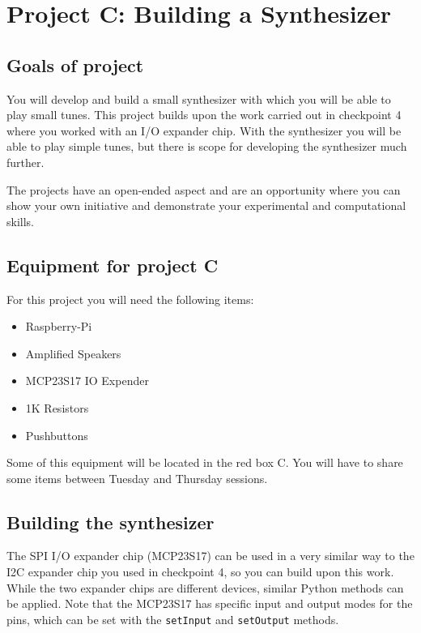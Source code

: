 

\newpage
\section{Project C: Building a Synthesizer}

\subsection{Goals of project}

You will develop and build a small synthesizer with which you will be able to play small tunes. This project builds upon the work carried out in checkpoint 4 where you worked with an I/O expander chip. With the synthesizer you will be able to play simple tunes, but there is scope for developing the synthesizer much further.

The projects have an open-ended aspect and are an opportunity where you can show your own initiative and demonstrate your experimental and computational skills. 


\subsection{Equipment for project C}

For this project you will need the following items:
\begin{itemize}
\item Raspberry-Pi
\item  Amplified Speakers
\item MCP23S17 IO Expender
\item 1K Resistors
\item Pushbuttons
\end{itemize}
Some of this equipment will be located in the red box C. You will have to share some items between Tuesday and Thursday sessions. 


\subsection{Building the synthesizer}

The SPI I/O expander chip (MCP23S17) can be used in a very similar way to the I2C expander chip you used in checkpoint 4, so you can build upon this work.
While the two expander chips are different devices, similar Python methods can be applied.%
Note that the MCP23S17 has specific input and output modes for the pins, which can be set with the \texttt{setInput} and \texttt{setOutput} methods.

